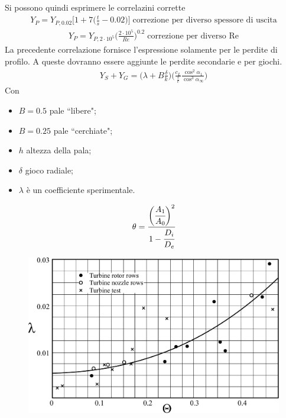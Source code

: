 Si possono quindi esprimere le correlazini corrette
\begin{align*}
Y_P = Y_{P,0.02} \bigg[ 1 + 7 \bigg( \frac{t}{s} - 0.02 \bigg) \bigg] \; \mbox{correzione per diverso spessore di uscita}
\end{align*}
\begin{align*}
Y_P = Y_{P,2 \cdot 10^5} \bigg( \frac{2 \cdot 10^5}{Re} \bigg)^{0.2} \; \mbox{correzione per diverso Re}
\end{align*}
La precedente correlazione fornisce l'espressione solamente per le perdite di profilo. A queste dovranno essere aggiunte le perdite secondarie e per giochi.
\begin{align*}
Y_S + Y_G = \Big( \lambda + B \frac{\delta}{k} \Big) \Bigg( \frac{c_L}{\frac{s}{c}} \frac{\cos^2 \alpha_1}{\cos^3 \alpha_{\infty}} \Bigg)
\end{align*}
Con
\begin{itemize}
\item $B = 0.5$ pale ``libere";
\item $B = 0.25$ pale ``cerchiate";
\item $h$ altezza della pala;
\item $\delta$ gioco radiale;
\item $\lambda$ è un coefficiente sperimentale.
\end{itemize}
\begin{align*}
\theta = \cfrac{\bigg(\cfrac{A_1}{A_0}\bigg)^2}{1- \cfrac{D_i}{D_e}}
\end{align*}
\begin{figure}
\centering
  \includegraphics[width=.6\textwidth]{fig/lambdaPerditeSchiera.pdf}
\caption{}
\label{fig:lambdaPerditeSchiera}
\end{figure}

